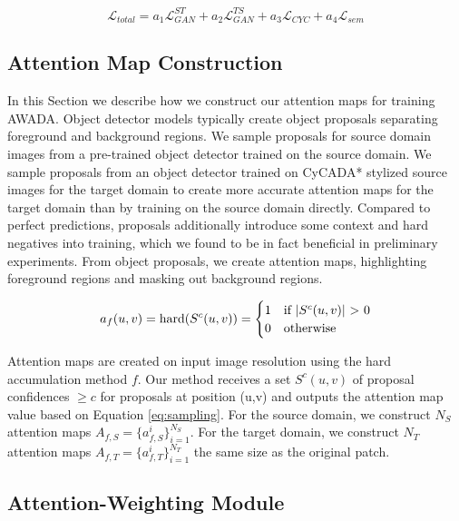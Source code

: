 \documentclass[10pt,twocolumn,letterpaper]{article}
\begin{document}
\begin{equation}
	\label{eq:GAN5}
	\mathcal{L}_{total} = a_1\mathcal{L}_{GAN}^{ST} + a_2\mathcal{L}_{GAN}^{TS} + a_3\mathcal{L}_{CYC} + a_4\mathcal{L}_{sem}
\end{equation}

\subsection{Attention Map Construction}
\label{sec:sampling}
In this Section we describe how we construct our attention maps for training AWADA. Object detector models typically create object proposals separating foreground and background regions. We sample proposals for source domain images from a pre-trained object detector trained on the source domain. We sample proposals from an object detector trained on CyCADA* stylized source images for the target domain to create more accurate attention maps for the target domain than by training on the source domain directly. Compared to perfect predictions, proposals additionally introduce some context and hard negatives into training, which we found to be in fact beneficial in preliminary experiments. From object proposals, we create attention maps, highlighting foreground regions and masking out background regions. 

\begin{equation}
	\label{eq:sampling}
	a_f(u,v) = \mbox{hard}(S^c(u,v)) = 
	\begin{cases}
		1 &\text{if $\left|S^c(u,v)\right|$ \textgreater \hphantom{} 0}\\
		0 &\text{otherwise} 
	\end{cases}
\end{equation}

Attention maps are created on input image resolution using the hard accumulation method $f$. Our method receives a set $S^c(u,v)$ of proposal confidences $\geq c$ for proposals at position (u,v) and outputs the attention map value based on Equation \ref{eq:sampling}. For the source domain, we construct $N_S$ attention maps $A_{f,S} = \{a_{f,S}^i\}_{i = 1}^{N_S}$. For the target domain, we construct $N_T$ attention maps $A_{f,T} = \{a_{f,T}^i\}_{i = 1}^{N_T}$ the same size as the original patch.

\subsection{Attention-Weighting Module}
\end{document}

